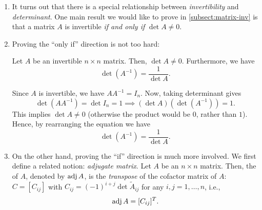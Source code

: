 \begin{enumerate}
\item It turns out that there is a special relationship between
\emph{invertibility} and \emph{determinant}. One main result we would like to
prove in \cref{subsect:matrix-inv} is that a matrix \(A\) is invertible
\emph{if and only if} \(\det A\ne 0\).

\item Proving the ``only if'' direction is not too hard:
\begin{proposition}
\label{prp:det-inv-fmla}
Let \(A\) be an invertible \(n\times n\) matrix. Then, \(\det A\ne 0\).
Furthermore, we have
\[
\det(A^{-1})=\frac{1}{\det A}.
\]
\end{proposition}
\begin{pf}
Since \(A\) is invertible, we have \(AA^{-1}=I_n\). Now, taking determinant gives
\[
\det(AA^{-1})=\det I_n=1
\implies
(\det A)(\det(A^{-1}))=1.
\]
This implies \(\det A\ne 0\) (otherwise the product would be \(0\), rather than
\(1\)).  Hence, by rearranging the equation we have
\[
\det(A^{-1})=\frac{1}{\det A}.
\]
\end{pf}

\item On the other hand, proving the ``if'' direction is much more involved. We
first define a related notion: \emph{adjugate matrix}. Let \(A\) be an
\(n\times n\) matrix. Then, the  of \(A\), denoted by \(\operatorname{adj}
A\), is the \emph{transpose} of the cofactor matrix of \(A\): \(C=[C_{ij}]\)
with \(C_{ij}=(-1)^{i+j}\det\widetilde{A}_{ij}\) for any \(i,j=1,\dotsc,n\),
i.e.,
\[
\operatorname{adj} A=[C_{ij}]^{T}.
\]


\end{enumerate}
